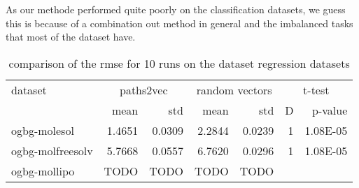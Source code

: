 As our methode performed quite poorly on the classification datasets, we guess this is because of a combination out method in general and the imbalanced tasks that most of the dataset have.

\begin{table}[h!]
    \centering
    \begin{tabular}{@{}lrrrrrr@{}}
        \toprule
        dataset          & \multicolumn{2}{c}{paths2vec} & \multicolumn{2}{c}{random vectors} & \multicolumn{2}{c}{t-test}                         \\ \cmidrule(l){2-3}\cmidrule(l){4-5}\cmidrule(l){6-7}
                         & mean                          & std                                & mean                       & std    & D & p-value  \\ \midrule
        ogbg-molesol     & 1.4651                        & 0.0309                             & 2.2844                     & 0.0239 & 1 & 1.08E-05 \\
        ogbg-molfreesolv & 5.7668                        & 0.0557                             & 6.7620                     & 0.0296 & 1 & 1.08E-05 \\
        ogbg-mollipo     & TODO                          & TODO                               & TODO                       & TODO   &   &          \\ \bottomrule
    \end{tabular}
    \caption{comparison of the rmse for 10 runs on the dataset regression datasets}
    \label{table:ogbg-molfreesolv_results}
\end{table}

%
%
%
%


